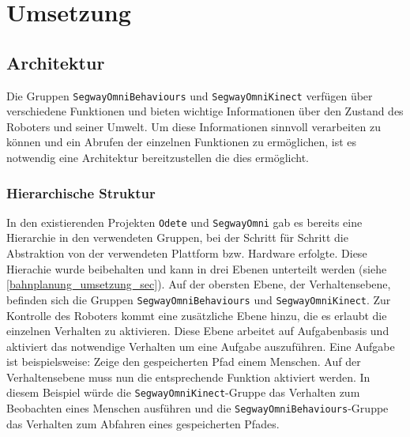 
\section{Umsetzung}
\label{umsetzung_integration_sec}

\subsection{Architektur}
\label{integration_architektur_sec}

Die Gruppen \lstinline{SegwayOmniBehaviours} und \lstinline{SegwayOmniKinect} verfügen über verschiedene Funktionen und bieten wichtige Informationen über den Zustand des Roboters und seiner Umwelt. Um diese Informationen sinnvoll verarbeiten zu können und ein Abrufen der einzelnen Funktionen zu ermöglichen, ist es notwendig eine Architektur bereitzustellen die dies ermöglicht.

\subsubsection{Hierarchische Struktur}
\label{integration_umsetzung_hierarchie_sec}

In den existierenden Projekten \lstinline{Odete} und \lstinline{SegwayOmni} gab es bereits eine Hierarchie in den verwendeten Gruppen, bei der Schritt für Schritt die Abstraktion von der verwendeten Plattform bzw. Hardware erfolgte. Diese Hierachie wurde beibehalten und kann in drei Ebenen unterteilt werden (siehe \ref{bahnplanung_umsetzung_sec}). Auf der obersten Ebene, der Verhaltensebene, befinden sich die Gruppen \lstinline{SegwayOmniBehaviours} und \lstinline{SegwayOmniKinect}. Zur Kontrolle des Roboters kommt eine zusätzliche Ebene hinzu, die es erlaubt die einzelnen Verhalten zu aktivieren. Diese Ebene arbeitet auf Aufgabenbasis und aktiviert das notwendige Verhalten um eine Aufgabe auszuführen. Eine Aufgabe ist beispielsweise: Zeige den gespeicherten Pfad einem Menschen. Auf der Verhaltensebene muss nun die entsprechende Funktion aktiviert werden. In diesem Beispiel würde die \lstinline{SegwayOmniKinect}-Gruppe das Verhalten zum Beobachten eines Menschen ausführen und die \lstinline{SegwayOmniBehaviours}-Gruppe das Verhalten zum Abfahren eines gespeicherten Pfades.

